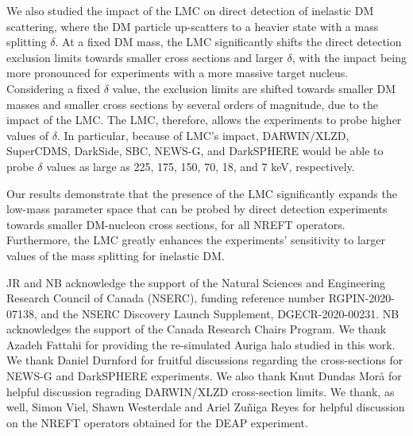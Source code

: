 \documentclass[a4paper,11pt]{article}
\begin{document}
We also studied the impact of the LMC on direct detection of inelastic DM scattering, where the DM particle up-scatters to a heavier state with a mass splitting $\delta$. At a fixed DM mass, the LMC significantly shifts the direct detection exclusion limits  towards smaller cross sections and larger $\delta$, with the impact being more pronounced for experiments with a more massive target nucleus. Considering a fixed $\delta$ value, the exclusion limits are shifted towards smaller DM masses and smaller cross sections by several orders of magnitude, due to the impact of the LMC. The LMC, therefore, allows the experiments to probe higher values of $\delta$. In particular, because of LMC's impact, DARWIN$\slash$XLZD, SuperCDMS, DarkSide, SBC, NEWS-G, and DarkSPHERE would be able to probe $\delta$ values as large as 225, 175, 150, 70, 18, and 7 keV, respectively. 

Our results demonstrate that the presence of the LMC significantly expands the low-mass parameter space that can be probed by direct detection experiments towards smaller DM-nucleon cross sections, for all NREFT operators. Furthermore, the LMC greatly enhances the experiments' sensitivity to larger values of the mass splitting for inelastic DM. 



\acknowledgments

JR and NB acknowledge the support of the Natural Sciences and Engineering Research Council of Canada (NSERC), funding reference number RGPIN-2020-07138, and the NSERC Discovery Launch Supplement, DGECR-2020-00231. NB acknowledges the support of the Canada Research Chairs Program. We thank Azadeh Fattahi for providing the re-simulated Auriga halo studied in this work. We thank Daniel Durnford for fruitful discussions regarding the cross-sections for NEWS-G and DarkSPHERE experiments. We also thank Knut Dundas Morå for helpful discussion regrading DARWIN/XLZD cross-section limits. We thank, as well, Simon Viel, Shawn Westerdale and Ariel Zuñiga Reyes for helpful discussion on the NREFT operators obtained for the DEAP experiment.



\appendix







\typeout{}


\end{document}
